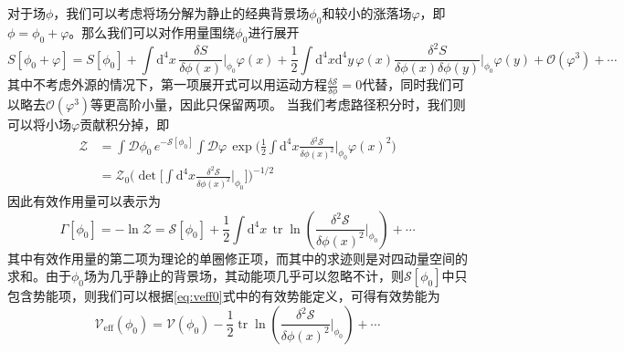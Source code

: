 对于场$\phi$，我们可以考虑将场分解为静止的经典背景场$\phi_0$和较小的涨落场$\varphi$，即$\phi=\phi_0+\varphi$。那么我们可以对作用量围绕$\phi_0$进行展开
\begin{equation}
    S[\phi_0 + \varphi] = S[\phi_0] + \int \mathrm{d}^4x \, \frac{\delta S}{\delta \phi(x)}\bigg|_{\phi_0} \varphi(x) + \frac{1}{2} \int \mathrm{d}^4x \mathrm{d}^4y \, \varphi(x) \frac{\delta^2 S}{\delta \phi(x)\delta \phi(y)}\bigg|_{\phi_0} \varphi(y) + \mathcal{O}(\varphi^3)+  \cdots
\end{equation}
其中不考虑外源的情况下，第一项展开式可以用运动方程$\frac{\delta\mathcal{S}}{\delta \phi}=0$代替，同时我们可以略去$\mathcal{O}(\varphi^3)$等更高阶小量，因此只保留两项。
当我们考虑路径积分时，我们则可以将小场$\varphi$贡献积分掉，即
\begin{equation}
\begin{split}
    \mathcal{Z} &= \int\mathcal{D}\phi_0\, e^{-\mathcal{S}[\phi_0]}\int\mathcal{D}\varphi\, \exp\Big( \frac{1}{2}\int \mathrm{d}^4x\frac{\delta^2\mathcal{S}}{\delta\phi(x)^2}\Big|_{\phi_0}\varphi(x)^2  \Big)\\
    &=\mathcal{Z}_0 \Big(\operatorname{det} \Big[\int \mathrm{d}^4x\frac{\delta^2\mathcal{S}}{\delta\phi(x)^2}\Big|_{\phi_0} \Big] \Big)^{-1/2}
\end{split}
\end{equation}
因此有效作用量可以表示为
\begin{equation}
    \Gamma[\phi_0] = -\ln\mathcal{Z} = \mathcal{S}[\phi_0] + \frac{1}{2}\int \mathrm{d}^4x\,\operatorname{tr}\ln \left( \frac{\delta^2\mathcal{S}}{\delta\phi(x)^2}\Big|_{\phi_0}  \right)+\cdots
\end{equation}
其中有效作用量的第二项为理论的单圈修正项，而其中的求迹则是对四动量空间的求和。由于$\phi_0$场为几乎静止的背景场，其动能项几乎可以忽略不计，则$\mathcal{S}[\phi_0]$中只包含势能项，则我们可以根据\eqref{eq:veff0}式中的有效势能定义，可得有效势能为
\begin{equation}
    \mathscr{V}_\mathrm{eff}(\phi_0) = \mathscr{V}(\phi_0) - \frac{1}{2}\operatorname{tr}\ln\left( \frac{\delta^2\mathcal{S}}{\delta\phi(x)^2}\Big|_{\phi_0}  \right)+\cdots
\end{equation}

